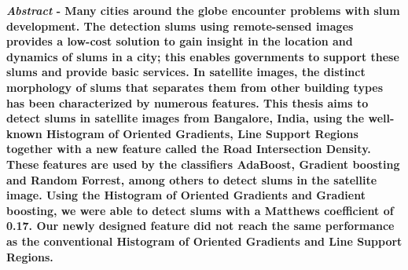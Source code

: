 \textbf{\textit{Abstract} - Many cities around the globe encounter problems with slum development. The detection slums using remote-sensed images provides a low-cost solution to gain insight in the location and dynamics of slums in a city; this enables governments to support these slums and provide basic services. In satellite images, the distinct morphology of slums that separates them from other building types has been characterized by numerous features. This thesis aims to detect slums in satellite images from Bangalore, India, using the well-known Histogram of Oriented Gradients, Line Support Regions together with a new feature called the Road Intersection Density. These features are used by the classifiers AdaBoost, Gradient boosting and Random Forrest, among others to detect slums in the satellite image. Using the Histogram of Oriented Gradients and Gradient boosting, we were able to detect slums with a Matthews coefficient of 0.17. Our newly designed feature did not reach the same performance as the conventional Histogram of Oriented Gradients and Line Support Regions. }